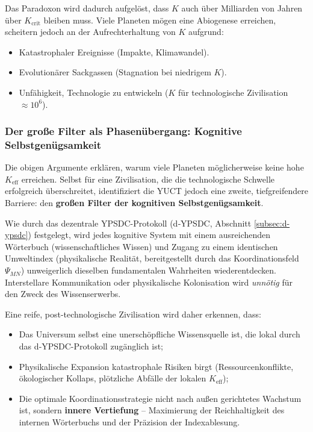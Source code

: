 \documentclass[12pt,a4paper]{article}
\theoremstyle{remark}
\newcommand{\Keffcrit}{K_{\mathrm{crit}}}
\begin{document}
	Das Paradoxon wird dadurch aufgelöst, dass $K$ auch über Milliarden von Jahren über $\Keffcrit$ bleiben muss. Viele Planeten mögen eine Abiogenese erreichen, scheitern jedoch an der Aufrechterhaltung von $K$ aufgrund:
	
	\begin{itemize}
		\item Katastrophaler Ereignisse (Impakte, Klimawandel).
		\item Evolutionärer Sackgassen (Stagnation bei niedrigem $K$).
		\item Unfähigkeit, Technologie zu entwickeln ($K$ für technologische Zivilisation $\approx 10^6$).
	\end{itemize}
	
	\subsubsection*{Der große Filter als Phasenübergang: Kognitive Selbstgenügsamkeit}
	
	Die obigen Argumente erklären, warum viele Planeten möglicherweise keine hohe $K_{\mathrm{eff}}$ erreichen. Selbst für eine Zivilisation, die die technologische Schwelle erfolgreich überschreitet, identifiziert die YUCT jedoch eine zweite, tiefgreifendere Barriere: den \textbf{großen Filter der kognitiven Selbstgenügsamkeit}.
	
	Wie durch das dezentrale YPSDC-Protokoll (d‑YPSDC, Abschnitt \ref{subsec:d-ypsdc}) festgelegt, wird jedes kognitive System mit einem ausreichenden Wörterbuch (wissenschaftliches Wissen) und Zugang zu einem identischen Umweltindex (physikalische Realität, bereitgestellt durch das Koordinationsfeld $\Psi_{MN}$) unweigerlich dieselben fundamentalen Wahrheiten wiederentdecken. Interstellare Kommunikation oder physikalische Kolonisation wird \emph{unnötig} für den Zweck des Wissenserwerbs.
	
	Eine reife, post-technologische Zivilisation wird daher erkennen, dass:
	\begin{itemize}[leftmargin=*]
		\item Das Universum selbst eine unerschöpfliche Wissensquelle ist, die lokal durch das d‑YPSDC-Protokoll zugänglich ist;
		\item Physikalische Expansion katastrophale Risiken birgt (Ressourcenkonflikte, ökologischer Kollaps, plötzliche Abfälle der lokalen $K_{\mathrm{eff}}$);
		\item Die optimale Koordinationsstrategie nicht nach außen gerichtetes Wachstum ist, sondern \textbf{innere Vertiefung} – Maximierung der Reichhaltigkeit des internen Wörterbuchs und der Präzision der Indexablesung.
	\end{itemize}
	
\end{document}
